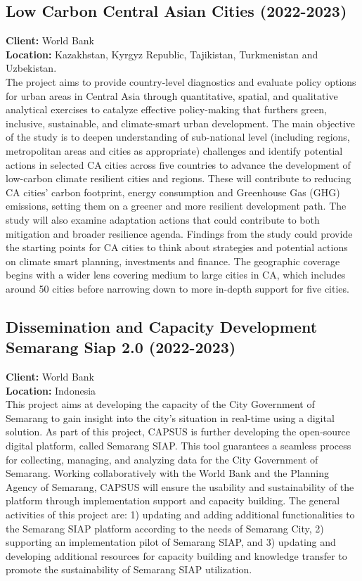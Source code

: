 \documentclass[
	a4paper,
	12pt,
	unnumberedsections,
]{CSSullivanBusinessReport}
\begin{document}
\subsection{Low Carbon Central Asian Cities (2022-2023)}
\textbf{Client:}  World Bank \\
\textbf{Location:}  Kazakhstan, Kyrgyz Republic, Tajikistan, Turkmenistan and Uzbekistan. \\[0.5em]
 The project aims to provide country-level diagnostics and evaluate policy options for urban areas in Central Asia through quantitative, spatial, and qualitative analytical exercises to catalyze effective policy-making that furthers green, inclusive, sustainable, and climate-smart urban development. The main objective of the study is to deepen understanding of sub-national level (including regions, metropolitan areas and cities as appropriate) challenges and identify potential actions in selected CA cities across five countries to advance the development of low-carbon climate resilient cities and regions. These will contribute to reducing CA cities’ carbon footprint, energy consumption and Greenhouse Gas (GHG) emissions, setting them on a greener and more resilient development path. The study will also examine adaptation actions that could contribute to both mitigation and broader resilience agenda. Findings from the study could provide the starting points for CA cities to think about strategies and potential actions on climate smart planning, investments and finance. The geographic coverage begins with a wider lens covering medium to large cities in CA, which includes around 50 cities before narrowing down to more in-depth support for five cities.

\subsection{Dissemination and Capacity Development Semarang Siap 2.0 (2022-2023)}
\textbf{Client:}  World Bank \\
\textbf{Location:}  Indonesia \\[0.5em]
 This project aims at developing the capacity of the City Government of Semarang to gain insight into the city's situation in real-time using a digital solution. As part of this project, CAPSUS is further developing the open-source digital platform, called Semarang SIAP. This tool guarantees a seamless process for collecting, managing, and analyzing data for the City Government of Semarang. Working collaboratively with the World Bank and the Planning Agency of Semarang, CAPSUS will ensure the usability and sustainability of the platform through implementation support and capacity building. The general activities of this project are: 1) updating and adding additional functionalities to the Semarang SIAP platform according to the needs of Semarang City, 2) supporting an implementation pilot of Semarang SIAP, and 3) updating and developing additional resources for capacity building and knowledge transfer to promote the sustainability of Semarang SIAP utilization.
\end{document}

